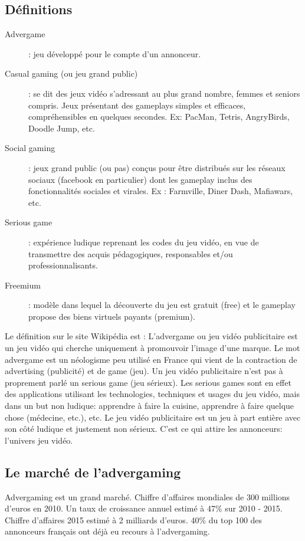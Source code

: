 \subsection{Définitions} %
\label{ssub:définitions}

\begin{description}
	\item[Advergame] : jeu développé pour le compte d’un annonceur.
	\item[Casual gaming (ou jeu grand public)] : se dit des jeux vidéo s'adressant au plus grand nombre, femmes et seniors compris. Jeux présentant des gameplays simples et efficaces, compréhensibles en quelques secondes. Ex: PacMan, Tetris, AngryBirds, Doodle Jump, etc.
	\item[Social gaming] : jeux grand public (ou pas) conçus pour être distribués sur les réseaux sociaux (facebook en particulier) dont les gameplay inclus des fonctionnalités sociales et virales. Ex : Farmville, Diner Dash, Mafiawars, etc.
	\item[Serious game] : expérience ludique reprenant les codes du jeu vidéo, en vue de transmettre des acquis pédagogiques, responsables et/ou professionnalisants.
	\item[Freemium] : modèle dans lequel la découverte du jeu est gratuit (free) et le gameplay propose des biens virtuels payants (premium).
\end{description}
Le définition sur le site Wikipédia est : L'advergame ou jeu vidéo publicitaire est un jeu vidéo qui cherche uniquement à promouvoir l'image d'une marque. Le mot advergame est un néologisme peu utilisé en France qui vient de la contraction de advertising (publicité) et de game (jeu). Un jeu vidéo publicitaire n'est pas à proprement parlé un serious game (jeu sérieux). Les serious games sont en effet des applications utilisant les technologies, techniques et usages du jeu vidéo, mais dans un but non ludique: apprendre à faire la cuisine, apprendre à faire quelque chose (médecine, etc.), etc.
Le jeu vidéo publicitaire est un jeu à part entière avec son côté ludique et justement non sérieux. C'est ce qui attire les annonceurs: l'univers jeu vidéo.


\subsection{Le marché de l'advergaming} %
\label{ssub:le_marché_de_l_advergame}

Advergaming est un grand marché. Chiffre d’affaires mondiales de 300 millions d’euros en 2010. Un taux de croissance annuel estimé à 47\% sur 2010 - 2015. Chiffre d’affaires 2015 estimé à 2 milliards d’euros. 40\% du top 100 des annonceurs français ont déjà eu recours à l’advergaming.



